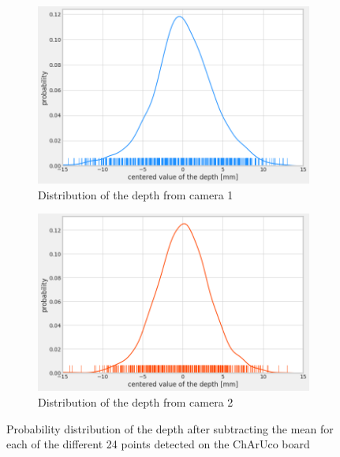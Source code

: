 \begin{figure}[H]
\centering
  \begin{subfigure}[b]{0.48 \textwidth}
    \includegraphics[width=\textwidth]{images/visual_enhancement/master_depth_curve.png}
    \caption{Distribution of the depth from camera 1}
    \label{figure:master_depth_curve}
  \end{subfigure}
  \hfill
  \begin{subfigure}[b]{0.48 \textwidth}
    \includegraphics[width=\textwidth]{images/visual_enhancement/sub_depth_curve.png}
    \caption{Distribution of the depth from camera 2}
    \label{figure:sub_depth_curve}
  \end{subfigure}
  \caption{Probability distribution of the depth after subtracting the mean for each of the different 24 points detected on the ChArUco board}
  \label{figure:depth_curve}
\end{figure}

